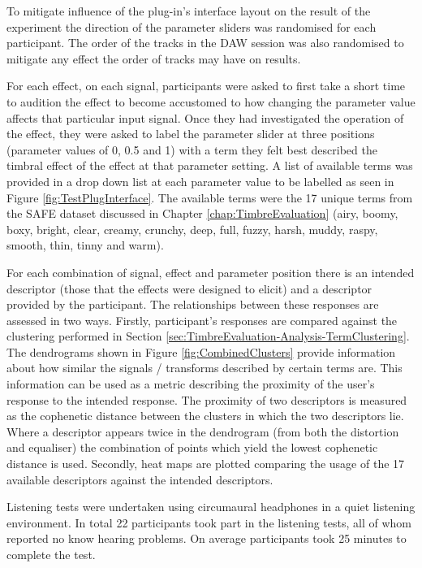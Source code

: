 			To mitigate influence of the plug-in's interface layout on the result of the experiment the
			direction of the parameter sliders was randomised for each participant. The order of the tracks in
			the DAW session was also randomised to mitigate any effect the order of tracks may have on results.

			For each effect, on each signal, participants were asked to first take a short time to audition the
			effect to become accustomed to how changing the parameter value affects that particular input
			signal. Once they had investigated the operation of the effect, they were asked to label the
			parameter slider at three positions (parameter values of 0, 0.5 and 1) with a term they felt best
			described the timbral effect of the effect at that parameter setting. A list of available terms was
			provided in a drop down list at each parameter value to be labelled as seen in Figure
			\ref{fig:TestPlugInterface}. The available terms were the 17 unique terms from the SAFE dataset
			discussed in Chapter \ref{chap:TimbreEvaluation} (airy, boomy, boxy, bright, clear, creamy,
			crunchy, deep, full, fuzzy, harsh, muddy, raspy, smooth, thin, tinny and warm).

			For each combination of signal, effect and parameter position there is an intended descriptor
			(those that the effects were designed to elicit) and a descriptor provided by the participant. The
			relationships between these responses are assessed in two ways. Firstly, participant's responses
			are compared against the clustering performed in Section
			\ref{sec:TimbreEvaluation-Analysis-TermClustering}. The dendrograms shown in Figure
			\ref{fig:CombinedClusters} provide information about how similar the signals / transforms described
			by certain terms are. This information can be used as a metric describing the proximity of the
			user's response to the intended response. The proximity of two descriptors is measured as the
			cophenetic distance between the clusters in which the two descriptors lie. Where a descriptor
			appears twice in the dendrogram (from both the distortion and equaliser) the combination of points
			which yield the lowest cophenetic distance is used. Secondly, heat maps are plotted comparing the
			usage of the 17 available descriptors against the intended descriptors.

			Listening tests were undertaken using circumaural headphones in a quiet listening environment. In
			total 22 participants took part in the listening tests, all of whom reported no know hearing
			problems. On average participants took 25 minutes to complete the test.

